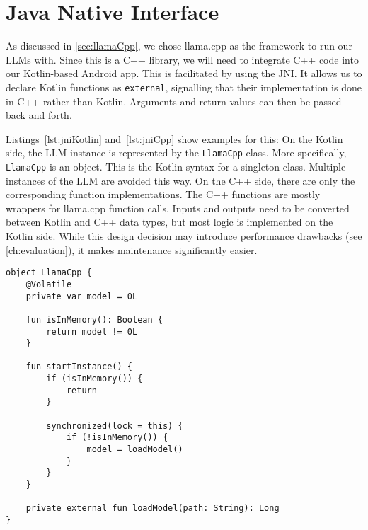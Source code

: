 \section{Java Native Interface}
\label{sec:jni}
As discussed in \cref{sec:llamaCpp}, we chose llama.cpp as the framework to run our \glspl{LLM} with. Since this is a C++ library, we will need to integrate C++ code into our Kotlin-based Android app. This is facilitated by using the \gls{JNI}. It allows us to declare Kotlin functions as \lstinline|external|, signalling that their implementation is done in C++ rather than Kotlin. Arguments and return values can then be passed back and forth.

Listings~\ref{lst:jniKotlin} and~\ref{lst:jniCpp} show examples for this: On the Kotlin side, the \gls{LLM} instance is represented by the \lstinline|LlamaCpp| class. More specifically, \lstinline|LlamaCpp| is an object. This is the Kotlin syntax for a singleton class. Multiple instances of the \gls{LLM} are avoided this way. On the C++ side, there are only the corresponding function implementations. The C++ functions are mostly wrappers for llama.cpp function calls. Inputs and outputs need to be converted between Kotlin and C++ data types, but most logic is implemented on the Kotlin side. While this design decision may introduce performance drawbacks (see \cref{ch:evaluation}), it makes maintenance significantly easier.

\vspace{0.25cm}

\begin{lstlisting}[caption={[JNI: Kotlin side]{Example for the Kotlin side of the \gls{JNI}: State management for the \gls{LLM} using a function declared \lstinline|external| at the end.}}, label={lst:jniKotlin}]
object LlamaCpp {
    @Volatile
    private var model = 0L

    fun isInMemory(): Boolean {
        return model != 0L
    }

    fun startInstance() {
        if (isInMemory()) {
            return
        }

        synchronized(lock = this) {
            if (!isInMemory()) {
                model = loadModel()
            }
        }
    }

    private external fun loadModel(path: String): Long
}
\end{lstlisting}

